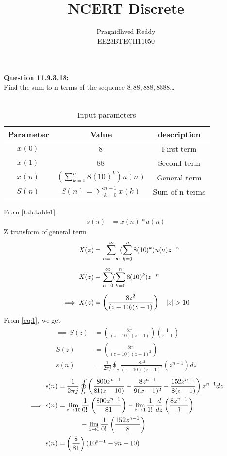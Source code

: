 \documentclass[journal,12pt,twocolumn]{IEEEtran}
\title{NCERT Discrete}
\author{Pragnidhved Reddy\\EE23BTECH11050}
\date{}
\begin{document}
\maketitle
\newpage
\bigskip
\textbf{Question 11.9.3.18:}\\
 Find the sum to n terms of the sequence $8,88,888,8888$\ldots\\
 \solution \\
 \begin{table}[H]
\centering
\setlength{\extrarowheight}{8pt}
\begin{tabular}{|c|c|c|}\hline
\textbf{Parameter} & \textbf{Value} & \textbf{description}\\ \hline
$x(0)$ & 8 & First term \\ \hline
$x(1)$ & 88 & Second term \\ \hline 
$x(n)$ & $(\sum^{n}_{k=0}8(10)^k)u(n)$ & General term \\ \hline
$S(n)$ & $S(n)=\sum^{n-1}_{k=0}x(k)$ & Sum of n terms \\ \hline
\end{tabular}
\caption{Input parameters}
\label{tab:table1}
\end{table}
 From \eqref{tab:table1}
\begin{align}
\label{eq:1}
 s(n)&=x(n)* u(n)
 \end{align}
 Z transform of general term
 \begin{align}
 X(z)&=\sum_{n=-\infty}^{\infty}(\sum_{k=0}^{n}8(10)^k)u(n)z^{-n}\\[6pt]
 X(z)&=\sum_{n=0}^{\infty}(\sum_{k=0}^{n}8(10)^k)z^{-n}\\[6pt]
 \implies X(z)&=\left(\frac{8z^2}{(z-10)(z-1)}\right) \quad \left\vert z\right\vert>10
\end{align}
From \eqref{eq:1}, we get
 \begin{align}
 \label{eq:6}
 \implies S(z)&=\left(\frac{8z^2}{(z-10)(z-1)}\right)\left(\frac{1}{z-1}\right)\\[6pt]
 S(z)&=\left(\frac{8z^2}{(z-10)(z-1)^2}\right)\\[6pt]
 s(n)&=\frac{1}{2\pi j}\oint_{c}\frac{8z^2}{(z-10)(z-1)^2}(z^{n-1})dz
 \end{align}
\begin{align}
s(n)&=\frac{1}{2\pi j} \oint_{c} \left(\frac{800z^{n-1}}{81(z-10)}-\frac{8z^{n-1}}{9(x-1)^2}-\frac{152z^{n-1}}{8(z-1)}\right)z^{n-1}dz\\
\notag \implies s(n)&=\lim_{z\to10}\frac{1}{0\displaystyle !\,}\left(\frac{800z^{n-1}}{81}\right)-\lim_{z\to1}\frac{1}{1\displaystyle !\,}\frac{d}{dz}\left(\frac{8z^{n-1}}{9}\right) \\ &~~~~~~~~~~-\lim_{z\to1}\frac{1}{0\displaystyle !\,}\left(\frac{152z^{n-1}}{8}\right)\\
 s(n)&=\left(\frac{8}{81}\right)(10^{n+1}-9n-10)   
\end{align}
 
\end{document}
